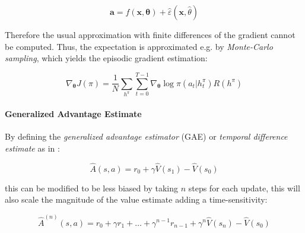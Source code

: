 \begin{equation}
    \mathbf{a} = f(\mathbf{x}, \boldsymbol{\theta}) + \hat{\varepsilon}(\mathbf{x}, \hat{\theta})
\end{equation}


Therefore the usual approximation with finite differences of the gradient cannot be computed. Thus, the expectation is approximated e.g. by \textit{Monte-Carlo sampling}, which yields \citep{williams_simple_1992} the episodic gradient estimation:

\begin{equation}
    \nabla _{\boldsymbol{\theta}} J(\pi) = \frac{1}{N} \sum _{h^{\pi}} \sum ^{T-1} _{t = 0} \nabla _{\boldsymbol{\theta}} \log \pi(a _t | h _t ^{\pi}) R(h ^{\pi})
\end{equation}



\paragraph{Generalized Advantage Estimate}
By defining the \textit{generalized advantage estimator} (\ac{GAE}) or \textit{temporal difference estimate} as in \cite{schulman_high-dimensional_2018}:

\begin{equation}
    \hat{A}(s,a) = r _0 + \gamma \hat{V}(s _1) - \hat{V}(s _0)
\end{equation}

this can be modified to be less biased by taking $n$ steps for each update, this will also scale the magnitude of the value estimate adding a time-sensitivity:

\begin{equation}
    \hat{A} ^{(n)} (s,a) = r _0 + \gamma r _1 + \dots + \gamma ^{n-1} r _{n-1} + \gamma ^n \hat{V}(s _n) - \hat{V}(s _0)
\end{equation}

